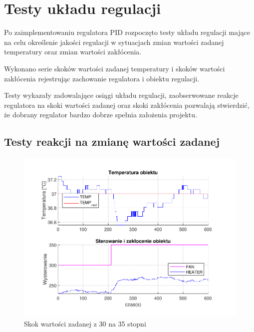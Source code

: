 \documentclass{mwrep}
\begin{document}
\chapter{Testy układu regulacji}
\label{Testy}

Po zaimplementowaniu regulatora PID rozpoczęto testy układu regulacji mające na celu określenie jakości regulacji w sytuacjach zmian wartości zadanej temperatury oraz zmian wartości zakłócenia.

Wykonano serie skoków wartości zadanej temperatury i skoków wartości zakłócenia rejestrując zachowanie regulatora i obiektu regulacji.

Testy wykazały zadowalające osiągi układu regulacji, zaobserwowane reakcje regulatora na  skoki wartości zadanej oraz skoki zakłócenia pozwalają stwierdzić, że dobrany regulator bardzo dobrze spełnia założenia projektu. 


\section{Testy reakcji na zmianę wartości zadanej}
\label{TestyWewnetrzne}

\begin{figure}[H]
\centering
\includegraphics[scale=0.85]{materialy/krystian_plots/3035wiatrzakl.pdf}
\caption{Skok wartości zadanej z 30 na 35 stopni}
\end{figure}
\end{document}
